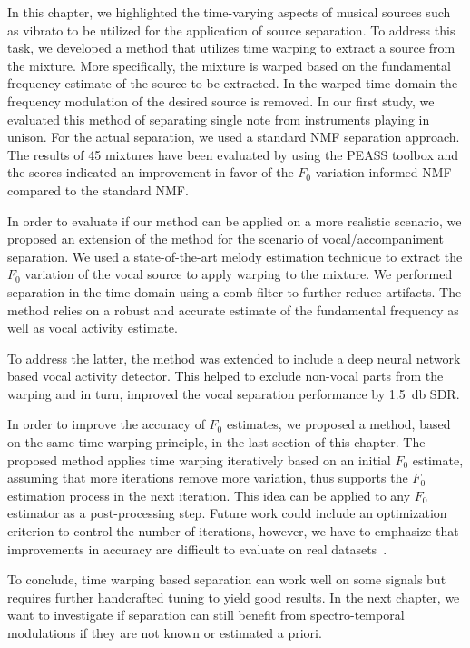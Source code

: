In this chapter, we highlighted the time-varying aspects of musical sources such as vibrato to be utilized for the application of source separation.
To address this task, we developed a method that utilizes time warping to extract a source from the mixture.
More specifically, the mixture is warped based on the fundamental frequency estimate of the source to be extracted. 
In the warped time domain the frequency modulation of the desired source is removed. 
In our first study, we evaluated this method of separating single note from instruments playing in unison.
For the actual separation, we used a standard NMF separation approach.
The results of 45 mixtures have been evaluated by using the PEASS toolbox and the scores indicated an improvement in favor of the $F_0$ variation informed NMF compared to the standard NMF.
\par
In order to evaluate if our method can be applied on a more realistic scenario, we proposed an extension of the method for the scenario of vocal/accompaniment separation.
We used a state-of-the-art melody estimation technique to extract the \(F_0\) variation of the vocal source to apply warping to the mixture.
We performed separation in the time domain using a comb filter to further reduce artifacts.
The method relies on a robust and accurate estimate of the fundamental frequency as well as vocal activity estimate.
\par
To address the latter, the method was extended to include a deep neural network based vocal activity detector.
This helped to exclude non-vocal parts from the warping and in turn, improved the vocal separation performance by 1.5~\si{\decibel} SDR.
\par
In order to improve the accuracy of \(F_0\) estimates, we proposed a method, based on the same time warping principle, in the last section of this chapter. 
The proposed method applies time warping iteratively based on an initial \(F_0\) estimate, assuming that more iterations remove more variation, thus supports the \(F_0\) estimation process in the next iteration.
This idea can be applied to any \(F_0\) estimator as a post-processing step.
Future work could include an optimization criterion to control the number of iterations, however, we have to emphasize that improvements in accuracy are difficult to evaluate on real datasets~\cite{stoeter15acm}.
\par
To conclude, time warping based separation can work well on some signals but requires further handcrafted tuning to yield good results.
In the next chapter, we want to investigate if separation can still benefit from spectro-temporal modulations if they are not known or estimated a priori.